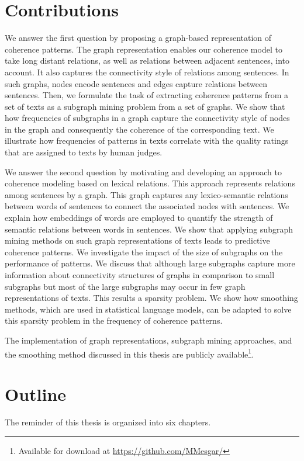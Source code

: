 \section{Contributions}
\label{sec:intro-contributions}

We answer the first question by proposing a graph-based representation of coherence patterns. 
The graph representation enables our coherence model to take long distant relations, as well as relations between adjacent sentences,  into account. 
It also captures the connectivity style of relations among sentences. 
In such graphs, nodes encode sentences and edges capture relations between sentences. 
Then, we formulate the task of extracting coherence patterns from a set of texts as a subgraph mining problem from a set of graphs. 
We show that how frequencies of subgraphs in a graph capture the connectivity style of nodes in the graph and consequently the coherence of the corresponding text. 
We illustrate how frequencies of patterns in texts correlate with the quality ratings that are assigned to texts by human judges. 

We answer the second question by motivating and developing an approach to coherence modeling based on lexical relations. 
This approach represents relations among sentences by a graph. 
This graph captures any lexico-semantic relations between words of sentences to connect the associated nodes with sentences. 
We explain how embeddings of words are employed to quantify the strength of semantic relations between words in sentences. 
We show that applying subgraph mining methods on such graph representations of texts leads to  predictive coherence patterns. 
We investigate the impact of the size of subgraphs on the performance of patterns. 
We discuss that although large subgraphs capture more information about connectivity structures of graphs in comparison to small subgraphs but most of the large subgraphs may occur in few graph representations of texts.  
This results a sparsity problem. 
We show how smoothing methods, which are used in statistical language models, can be adapted to solve this sparsity problem in the frequency of coherence patterns. 

The implementation of graph representations, subgraph mining approaches, and the smoothing method discussed in this thesis are publicly available\footnote{Available for download at \url{https://github.com/MMesgar/}}. 


\section{Outline}
\label{sec:intro-outline}
The reminder of this thesis is organized into six chapters. 

